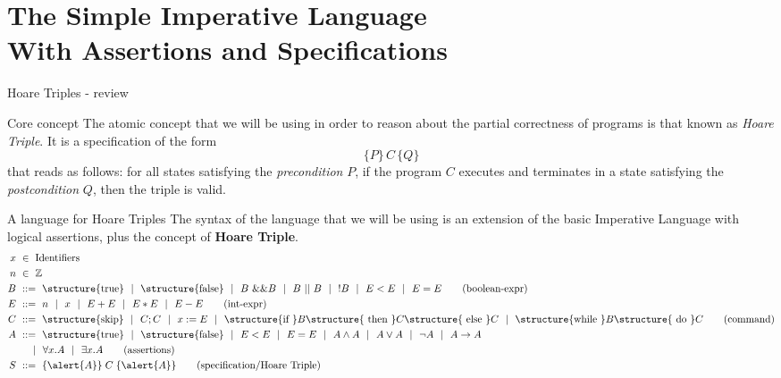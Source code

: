 \documentclass[aspectratio=169]{beamer}
\begin{document}
\frame[plain]{\titlepage}


\section{The Simple Imperative Language\\\small{With Assertions and Specifications}}

\newcommand{\kw}[1]{\structure{\text{#1}}}


\begin{slide}{Hoare Triples - review}
  
  \begin{block}{Core concept}
    The atomic concept that we will be using in order to reason about the partial correctness of programs is that known as {\em Hoare Triple}. It is a specification of the form $$\{P\}\,C\,\{Q\}$$ that reads as follows: for all states satisfying the {\em \alert{precondition}} $P$, if the program $C$ executes and terminates in a state satisfying the {\em \alert{postcondition}} $Q$, then the triple is valid.
  \end{block}
\end{slide}

\begin{slide}{A language for Hoare Triples}
  The syntax of the language that we will be using is an extension of the basic Imperative Language with logical assertions, plus the concept of \textbf{Hoare Triple}. 
  \begin{align*}
  x &~\in~ \text{Identifiers}
  \\
  n &~\in~ \mathbb{Z}
  \\
  B &~::=~ \kw{true} ~~|~~ \kw{false}  ~~|~~ B~ \&\& B ~~|~~ B ~||~ B ~~|~~ ! B ~~|~~ E<E ~~|~~ E=E
  \tag{boolean-expr}\\
  E &~::=~ n ~~|~~ x ~~|~~ E+E ~~|~~ E*E ~~|~~ E-E
  \tag{int-expr}\\
  C &~::=~ \kw {skip} ~~|~~ C;C ~~|~~ x:=E
 ~~|~~  \kw{if } B \kw{ then } C\kw{ else }C ~~|~~  \kw{while }B\kw{ do }C
  \tag{command}\\
  A &~::=~ \kw{true} ~~|~~ \kw{false}  ~~|~~ E<E ~~|~~ E=E ~~|~~ A \land A ~~|~~ A \lor A ~~|~~ \lnot A ~~|~~ A \to A\\
  &~~~~~|~~  \forall x. A ~~|~~\exists x.A \tag{assertions}\\
  S & ~::=~ \{\alert{A}\}\;C\;\{\alert{A}\}\tag{specification/Hoare Triple}
\end{align*}
\end{slide}
\end{document}

